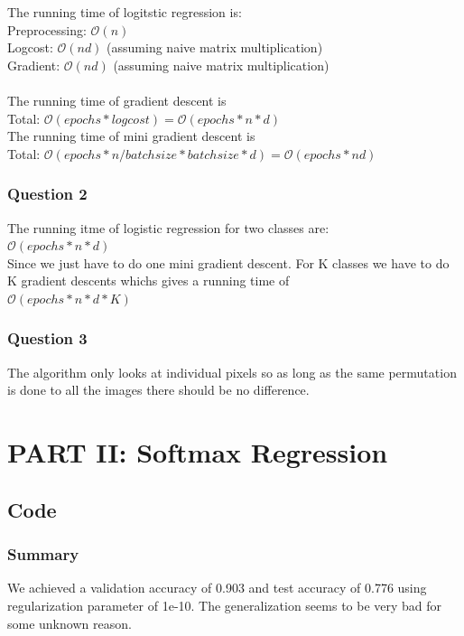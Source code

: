 \documentclass[paper=a4, fontsize=11pt]{scrartcl} %
\numberwithin{equation}{section} %
\numberwithin{figure}{section} %
\numberwithin{table}{section} %
\begin{document}
The running time of logitstic regression is: \\ 
Preprocessing: $\mathcal{O}(n)$ \\
Logcost: $\mathcal{O}(nd)$ (assuming naive matrix multiplication) \\
Gradient: $\mathcal{O}(nd)$ (assuming naive matrix multiplication) \\
\\
The running time of gradient descent is \\
Total: $\mathcal{O}(epochs * logcost) = \mathcal{O}(epochs * n * d)$ \\
The running time of mini gradient descent is \\
Total: $\mathcal{O}(epochs * n/batchsize * batchsize * d) = \mathcal{O}(epochs * n d)$

\subsubsection{Question 2}
The running itme of logistic regression for two classes are: \\
$\mathcal{O}(epochs * n * d)$ \\
Since we just have to do one mini gradient descent.
For K classes we have to do K gradient descents whichs gives a running time of \\
$\mathcal{O}(epochs * n * d * K)$ \\

\subsubsection{Question 3 }
The algorithm only looks at individual pixels so as long as the same permutation is done to all the images there should be no difference.

\section{PART II: Softmax Regression}

\subsection{Code}

\subsubsection{Summary}
We achieved a validation accuracy of 0.903 and test accuracy of 0.776 using regularization parameter of 1e-10. The generalization seems to be very bad for some unknown reason. 
\end{document}
